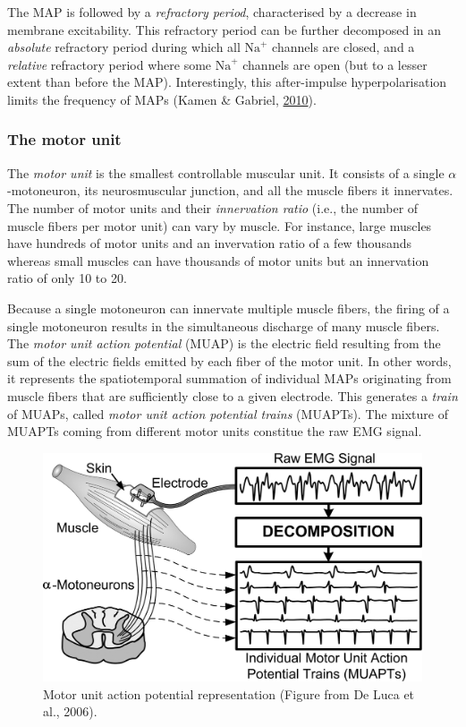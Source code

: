 \documentclass[a4paper,12pt,twoside,openright,oldfontcommands]{memoir}
\begin{document}
The MAP is followed by a \emph{refractory period}, characterised by a
decrease in membrane excitability. This refractory period can be further
decomposed in an \emph{absolute} refractory period during which all
\(\text{Na}^{+}\) channels are closed, and a \emph{relative} refractory
period where some \(\text{Na}^{+}\) channels are open (but to a lesser
extent than before the MAP). Interestingly, this after-impulse
hyperpolarisation limits the frequency of MAPs (Kamen \& Gabriel,
\protect\hyperlink{ref-kamen_essentials_2010}{2010}).

\subsubsection{The motor unit}\label{the-motor-unit}

The \emph{motor unit} is the smallest controllable muscular unit. It
consists of a single \(\alpha\)-motoneuron, its neurosmuscular junction,
and all the muscle fibers it innervates. The number of motor units and
their \emph{innervation ratio} (i.e., the number of muscle fibers per
motor unit) can vary by muscle. For instance, large muscles have
hundreds of motor units and an invervation ratio of a few thousands
whereas small muscles can have thousands of motor units but an
innervation ratio of only 10 to 20.

Because a single motoneuron can innervate multiple muscle fibers, the
firing of a single motoneuron results in the simultaneous discharge of
many muscle fibers. The \emph{motor unit action potential} (MUAP) is the
electric field resulting from the sum of the electric fields emitted by
each fiber of the motor unit. In other words, it represents the
spatiotemporal summation of individual MAPs originating from muscle
fibers that are sufficiently close to a given electrode. This generates
a \emph{train} of MUAPs, called \emph{motor unit action potential
trains} (MUAPTs). The mixture of MUAPTs coming from different motor
units constitue the raw EMG signal.

\begin{figure}[H]

{\centering \includegraphics[width=0.75\linewidth]{assets/muap} 

}

\caption{Motor unit action potential representation (Figure from De Luca et al., 2006).}\label{fig:muap}
\end{figure}
\end{document}
